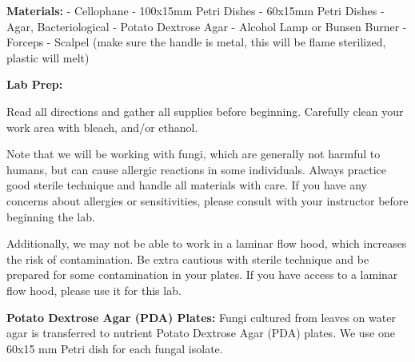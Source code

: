 \documentclass[
  letterpaper,
  DIV=11,
  numbers=noendperiod]{scrreprt}
\begin{document}
\textbf{Materials:} - Cellophane - 100x15mm Petri Dishes - 60x15mm Petri
Dishes - Agar, Bacteriological - Potato Dextrose Agar - Alcohol Lamp or
Bunsen Burner - Forceps - Scalpel (make sure the handle is metal, this
will be flame sterilized, plastic will melt)

\textbf{Lab Prep:}

\begin{tcolorbox}[enhanced jigsaw, arc=.35mm, bottomrule=.15mm, bottomtitle=1mm, breakable, colback=white, colbacktitle=quarto-callout-important-color!10!white, colframe=quarto-callout-important-color-frame, coltitle=black, left=2mm, leftrule=.75mm, opacityback=0, opacitybacktitle=0.6, rightrule=.15mm, title=\textcolor{quarto-callout-important-color}{\faExclamation}\hspace{0.5em}{Important}, titlerule=0mm, toprule=.15mm, toptitle=1mm]

Read all directions and gather all supplies before beginning. Carefully
clean your work area with bleach, and/or ethanol.

\end{tcolorbox}

\begin{tcolorbox}[enhanced jigsaw, arc=.35mm, bottomrule=.15mm, bottomtitle=1mm, breakable, colback=white, colbacktitle=quarto-callout-warning-color!10!white, colframe=quarto-callout-warning-color-frame, coltitle=black, left=2mm, leftrule=.75mm, opacityback=0, opacitybacktitle=0.6, rightrule=.15mm, title=\textcolor{quarto-callout-warning-color}{\faExclamationTriangle}\hspace{0.5em}{Warning}, titlerule=0mm, toprule=.15mm, toptitle=1mm]

Note that we will be working with fungi, which are generally not harmful
to humans, but can cause allergic reactions in some individuals. Always
practice good sterile technique and handle all materials with care. If
you have any concerns about allergies or sensitivities, please consult
with your instructor before beginning the lab.

Additionally, we may not be able to work in a laminar flow hood, which
increases the risk of contamination. Be extra cautious with sterile
technique and be prepared for some contamination in your plates. If you
have access to a laminar flow hood, please use it for this lab.

\end{tcolorbox}

\textbf{Potato Dextrose Agar (PDA) Plates:} Fungi cultured from leaves
on water agar is transferred to nutrient Potato Dextrose Agar (PDA)
plates. We use one 60x15 mm Petri dish for each fungal isolate.
\end{document}

